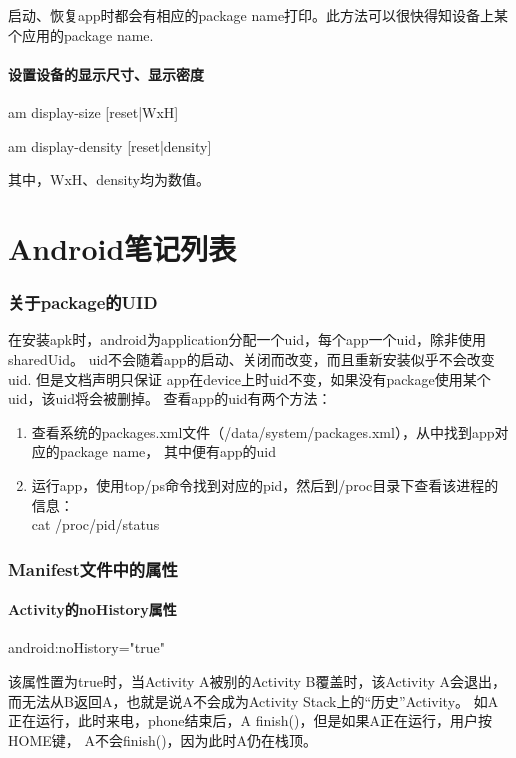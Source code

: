 ﻿\documentclass[a4paper,11pt]{article}
\begin{document}
  启动、恢复app时都会有相应的package name打印。此方法可以很快得知设备上某个应用的package name.

  \subsection[设置设备的显示尺寸、显示密度]{设置设备的显示尺寸、显示密度}
  am display-size [reset|WxH]

  am display-density [reset|density]

  其中，WxH、density均为数值。

  \part[Android Notes List]{Android笔记列表}
  \section[关于package的UID]{关于package的UID}
  在安装apk时，android为application分配一个uid，每个app一个uid，除非使用sharedUid。
	uid不会随着app的启动、关闭而改变，而且重新安装似乎不会改变uid. 但是文档声明只保证
	app在device上时uid不变，如果没有package使用某个uid，该uid将会被删掉。
	查看app的uid有两个方法：
  \begin{enumerate}
    \item 查看系统的packages.xml文件（/data/system/packages.xml），从中找到app对应的package name，
		      其中便有app的uid
    \item 运行app，使用top/ps命令找到对应的pid，然后到/proc目录下查看该进程的信息：\\
      		cat /proc/\lt pid\gt/status
  \end{enumerate}


  \section[Manifest文件中的属性]{Manifest文件中的属性}
  \subsection[Activity的noHistory属性]{Activity的noHistory属性}
  android:noHistory="true"

  该属性置为true时，当Activity A被别的Activity B覆盖时，该Activity A会退出，
  而无法从B返回A，也就是说A不会成为Activity Stack上的“历史”Activity。
  如A正在运行，此时来电，phone结束后，A finish()，但是如果A正在运行，用户按HOME键，
  A不会finish()，因为此时A仍在栈顶。
  
\end{document}

